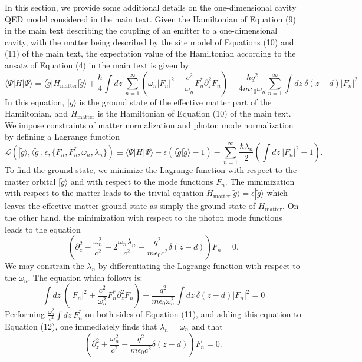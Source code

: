 \documentclass[aps,prb,onecolumn,preprint,
	groupedaddress,superscriptaddress,
	amsfonts,amssymb,amsmath,floatfix,
	citeautoscript]{revtex4-1}
\begin{document}
In this section, we provide some additional details on the one-dimensional cavity QED model considered in the main text. Given the Hamiltonian of Equation (9) in the main text describing the coupling of an emitter to a one-dimensional cavity, with the matter being described by the site model of Equations (10) and (11) of the main text, the expectation value of the Hamiltonian according to the ansatz of Equation (4) in the main text is given by
\begin{equation}
\langle \Psi | H | \Psi \rangle = \langle \tilde{g} |H_{\text{matter}} | \tilde{g}\rangle + \frac{\hbar}{4}\int dz ~\sum\limits_{n=1}^{\infty}\left(\omega_n|F_n|^2 - \frac{c^2}{\omega_n}F_n^*\partial_z^2F_n\right) + \frac{\hbar q^2}{4m\epsilon_0\omega_n}\sum\limits_{n=1}^{\infty} \int dz~\delta(z-d)|F_n|^2
\end{equation}
In this equation, $|\tilde{g}\rangle$ is the ground state of the effective matter part of the Hamiltonian, and $H_{\mathrm{matter}}$ is the Hamiltonian of Equation (10) of the main text.  We impose constraints of matter normalization and photon mode normalization by defining a Lagrange function 
\begin{equation}\label{eq:lagrange}
\mathcal{L}(|\tilde{g}\rangle, \langle \tilde{g}|,\epsilon, \{F_n, F_n^*, \omega_n, \lambda_n\}) \equiv \langle \Psi | H | \Psi \rangle - \epsilon(\langle \tilde{g}|\tilde{g}\rangle-1)-\sum\limits_{n=1}^{\infty}\frac{\hbar\lambda_n}{2}\left( \int dz~|F_n|^2-1\right).
\end{equation} 
To find the ground state, we minimize the Lagrange function with respect to the matter orbital $|\tilde{g}\rangle$ and with respect to the mode functions $F_n$. The minimization with respect to the matter leads to the trivial equation $H_{\text{matter}} |\tilde{g}\rangle = \epsilon|\tilde{g}\rangle$ which leaves the effective matter ground state as simply the ground state of $H_{\text{matter}}$. On the other hand, the minimization with respect to the photon mode functions leads to  the equation
\begin{equation}\label{eq:maxwell}
\left(\partial_z^2-\frac{\omega^2_n}{c^2}+2\frac{\omega_n\lambda_n}{c^2}-\frac{q^2 }{m\epsilon_0 c^2}\delta(z-d)\right)F_n  = 0.
\end{equation}
We may constrain the $\lambda_n$ by differentiating the Lagrange function with respect to the $\omega_n$. The equation which follows is:
\begin{equation}\label{eq:other_maxwell}
\int dz ~\left(|F_n|^2 + \frac{c^2}{\omega^2_n}F_n^*\partial_z^2F_n\right) - \frac{ q^2}{m\epsilon_0\omega^2_n} \int dz~\delta(z-d)|F_n|^2 = 0
\end{equation}
Performing $\frac{\omega_n^2}{c^2}\int dz~F_n^*$ on both sides of Equation (11), and adding this equation to Equation (12), one immediately finds that $\lambda_n = \omega_n$ and that
\begin{equation}\label{eq:final_maxwell}
\left(\partial_z^2+\frac{\omega^2_n}{c^2}-\frac{q^2 }{m\epsilon_0 c^2}\delta(z-d)\right)F_n  = 0.
\end{equation}
\end{document}
